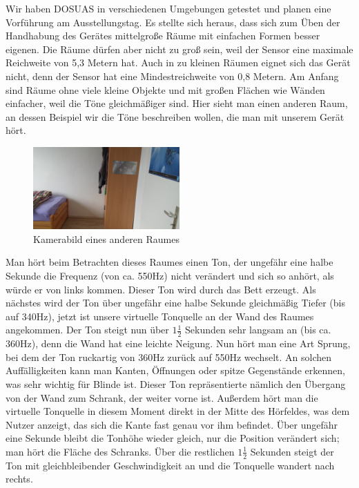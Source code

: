 \documentclass[a4paper,12pt,ngerman]{scrartcl}
\begin{document}
Wir haben DOSUAS in verschiedenen Umgebungen getestet und planen eine Vorführung am Ausstellungstag.
Es stellte sich heraus, dass sich zum Üben der Handhabung des Gerätes mittelgroße Räume mit einfachen
Formen besser eigenen. Die Räume dürfen aber nicht zu groß sein, weil der Sensor eine maximale Reichweite
von 5,3 Metern hat. Auch in zu kleinen Räumen eignet sich das Gerät nicht, denn der Sensor hat eine  Mindestreichweite von 0,8 Metern. Am Anfang sind Räume ohne viele kleine Objekte und mit großen 
Flächen wie Wänden einfacher, weil die Töne gleichmäßiger sind.
Hier sieht man einen anderen Raum, an dessen Beispiel wir die Töne beschreiben wollen, die man
mit unserem Gerät hört.
\begin{figure}[H]
	\centering
	\includegraphics[angle=180,width=0.5\textwidth]{20180120_114953}
	\caption{Kamerabild eines anderen Raumes}
	\label{normal_picture}
\end{figure} \par
Man hört beim Betrachten dieses Raumes einen Ton, der ungefähr eine halbe Sekunde die Frequenz (von ca. 550Hz) nicht verändert und sich so anhört, als würde er von links kommen. Dieser Ton wird durch das Bett
erzeugt. Als nächstes wird der Ton über ungefähr eine halbe Sekunde gleichmäßig Tiefer (bis auf 340Hz), 
jetzt ist unsere virtuelle Tonquelle an der Wand des Raumes angekommen. Der Ton steigt nun über $1\frac{1}{2}$ Sekunden sehr langsam an (bis ca. 360Hz), denn die Wand hat eine leichte Neigung. 
Nun hört man eine Art Sprung, bei dem der Ton ruckartig von 360Hz zurück auf 550Hz wechselt. An solchen Auffälligkeiten kann man Kanten, Öffnungen oder spitze Gegenstände erkennen, was sehr wichtig für Blinde
ist. Dieser Ton repräsentierte nämlich den Übergang von der Wand zum Schrank, der weiter vorne ist. Außerdem hört
man die virtuelle Tonquelle in diesem Moment direkt in der Mitte des Hörfeldes, was dem Nutzer anzeigt, das sich
die Kante fast genau vor ihm befindet. Über ungefähr eine Sekunde bleibt die Tonhöhe wieder gleich, nur die Position
verändert sich; man hört die Fläche des Schranks. Über die restlichen $1\frac{1}{2}$ Sekunden steigt der Ton mit 
gleichbleibender Geschwindigkeit an und die Tonquelle wandert nach rechts.
\end{document}
